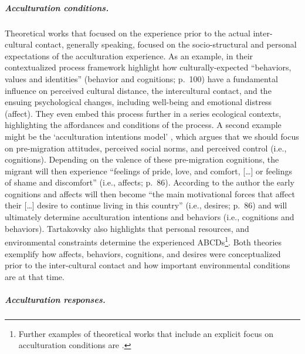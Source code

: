 \documentclass[man, 12pt, a4paper, mask]{apa7}
\begin{document}
\subparagraph{Acculturation conditions.}

Theoretical works that focused on the experience prior to the actual
inter-cultural contact, generally speaking, focused on the
socio-structural and personal expectations of the acculturation
experience. As an example, \citet[][]{Ward2016} in their contextualized
process framework highlight how culturally-expected ``behaviors, values
and identities'' (behavior and cognitions; p.~100) have a fundamental
influence on perceived cultural distance, the intercultural contact, and
the ensuing psychological changes, including well-being and emotional
distress (affect). They even embed this process further in a series
ecological contexts, highlighting the affordances and conditions of the
process. A second example might be the `acculturation intentions model'
\citep[][]{Tartakovsky2012}, which argues that we should focus on
pre-migration attitudes, perceived social norms, and perceived control
(i.e., cognitions). Depending on the valence of these pre-migration
cognitions, the migrant will then experience ``feelings of pride, love,
and comfort, {[}\ldots{]} or feelings of shame and discomfort'' (i.e.,
affects; p.~86). According to the author the early cognitions and
affects will then become ``the main motivational forces that affect
their {[}\ldots{]} desire to continue living in this country'' (i.e.,
desires; p.~86) and will ultimately determine acculturation intentions
and behaviors (i.e., cognitions and behaviors). Tartakovsky also
highlights that personal resources, and environmental constraints
determine the experienced
ABCDs\footnote{Further examples of theoretical works that include an explicit focus on acculturation conditions are \citet[][]{Kim1988, Rogler1994, Navas2005, Giles1977, Robinson2019, Serdarevic2005}.}.
Both theories exemplify how affects, behaviors, cognitions, and desires
were conceptualized prior to the inter-cultural contact and how
important environmental conditions are at that time.

\subparagraph{Acculturation responses.}
\end{document}
